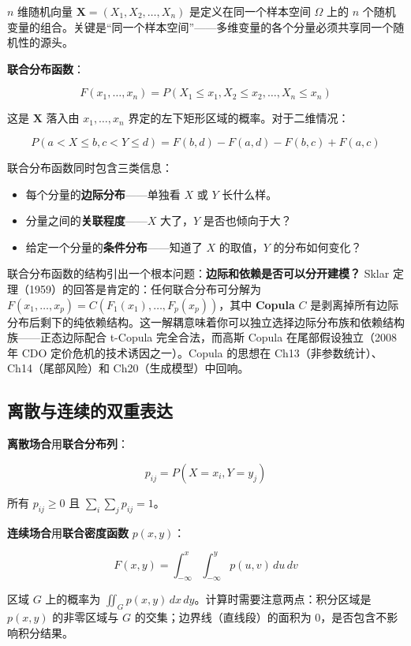 \documentclass[
]{book}
\providecommand{\tightlist}{%
  \setlength{\itemsep}{0pt}\setlength{\parskip}{0pt}}
\begin{document}
\(n\) 维随机向量 \(\mathbf{X} = (X_1, X_2, \ldots, X_n)\) 是定义在同一个样本空间 \(\Omega\) 上的 \(n\) 个随机变量的组合。关键是``同一个样本空间''------多维变量的各个分量必须共享同一个随机性的源头。

\textbf{联合分布函数}：

\[F(x_1, \ldots, x_n) = P(X_1 \leq x_1, X_2 \leq x_2, \ldots, X_n \leq x_n)\]

这是 \(\mathbf{X}\) 落入由 \(x_1, \ldots, x_n\) 界定的左下矩形区域的概率。对于二维情况：

\[P(a < X \leq b, c < Y \leq d) = F(b,d) - F(a,d) - F(b,c) + F(a,c)\]

联合分布函数同时包含三类信息：

\begin{itemize}
\tightlist
\item
  每个分量的\textbf{边际分布}------单独看 \(X\) 或 \(Y\) 长什么样。
\item
  分量之间的\textbf{关联程度}------\(X\) 大了，\(Y\) 是否也倾向于大？
\item
  给定一个分量的\textbf{条件分布}------知道了 \(X\) 的取值，\(Y\) 的分布如何变化？
\end{itemize}

联合分布函数的结构引出一个根本问题：\textbf{边际和依赖是否可以分开建模？} Sklar 定理（1959）的回答是肯定的：任何联合分布可分解为 \(F(x_1,\ldots,x_p) = C(F_1(x_1),\ldots,F_p(x_p))\)，其中 \textbf{Copula} \(C\) 是剥离掉所有边际分布后剩下的纯依赖结构。这一解耦意味着你可以独立选择边际分布族和依赖结构族------正态边际配合 t-Copula 完全合法，而高斯 Copula 在尾部假设独立（2008 年 CDO 定价危机的技术诱因之一）。Copula 的思想在 Ch13（非参数统计）、Ch14（尾部风险）和 Ch20（生成模型）中回响。

\subsection{离散与连续的双重表达}\label{ux79bbux6563ux4e0eux8fdeux7eedux7684ux53ccux91cdux8868ux8fbe}

\textbf{离散场合}用\textbf{联合分布列}：

\[p_{ij} = P(X = x_i, Y = y_j)\]

所有 \(p_{ij} \geq 0\) 且 \(\sum_i \sum_j p_{ij} = 1\)。

\textbf{连续场合}用\textbf{联合密度函数} \(p(x,y)\)：

\[F(x,y) = \int_{-\infty}^x \int_{-\infty}^y p(u,v) \, du \, dv\]

区域 \(G\) 上的概率为 \(\iint_G p(x,y) \, dx \, dy\)。计算时需要注意两点：积分区域是 \(p(x,y)\) 的非零区域与 \(G\) 的交集；边界线（直线段）的面积为 0，是否包含不影响积分结果。
\end{document}
